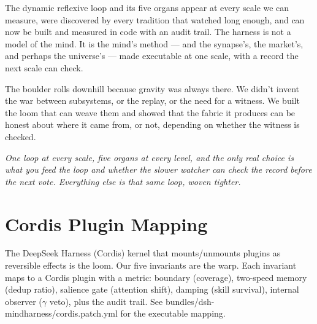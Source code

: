 \documentclass[11pt]{article}
\begin{document}
The dynamic reflexive loop and its five organs appear at every scale we can measure, were discovered by every tradition that watched long enough, and can now be built and measured in code with an audit trail. The harness is not a model of the mind. It is the mind's method --- and the synapse's, the market's, and perhaps the universe's --- made executable at one scale, with a record the next scale can check.

The boulder rolls downhill because gravity was always there. We didn't invent the war between subsystems, or the replay, or the need for a witness. We built the loom that can weave them and showed that the fabric it produces can be honest about where it came from, or not, depending on whether the witness is checked.

\begin{center}
\textit{One loop at every scale, five organs at every level, and the only real choice is what you feed the loop and whether the slower watcher can check the record before the next vote. Everything else is that same loop, woven tighter.}
\end{center}

\appendix
\section{Cordis Plugin Mapping}
\label{app:cordis}
The DeepSeek Harness (Cordis) kernel that mounts/unmounts plugins as reversible effects is the loom. Our five invariants are the warp. Each invariant maps to a Cordis plugin with a metric: boundary (coverage), two-speed memory (dedup ratio), salience gate (attention shift), damping (skill survival), internal observer ($\gamma$ veto), plus the audit trail. See bundles/dsh-mindharness/cordis.patch.yml for the executable mapping.
\end{document}
